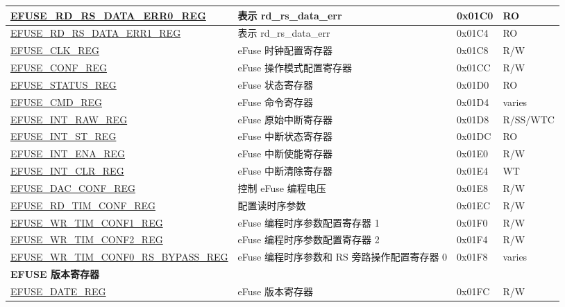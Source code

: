 \begin{longtable}{ | p{7cm} | p{6cm} | p{1.2cm} | p{1.5cm} | }
\hyperref[regdesc:EFUSERDRSDATAERR0REG]{EFUSE\_RD\_RS\_DATA\_ERR0\_REG} & 表示 rd\_rs\_data\_err & 0x01C0 & RO \\ \hline
\hyperref[regdesc:EFUSERDRSDATAERR1REG]{EFUSE\_RD\_RS\_DATA\_ERR1\_REG} & 表示 rd\_rs\_data\_err & 0x01C4 & RO \\ \hline
\hyperref[regdesc:EFUSECLKREG]{EFUSE\_CLK\_REG} & eFuse 时钟配置寄存器 & 0x01C8 & R/W \\ \hline
\hyperref[regdesc:EFUSECONFREG]{EFUSE\_CONF\_REG} & eFuse 操作模式配置寄存器 & 0x01CC & R/W \\ \hline
\hyperref[regdesc:EFUSESTATUSREG]{EFUSE\_STATUS\_REG} & eFuse 状态寄存器 & 0x01D0 & RO \\ \hline
\hyperref[regdesc:EFUSECMDREG]{EFUSE\_CMD\_REG} & eFuse 命令寄存器 & 0x01D4 & varies \\ \hline
\hyperref[regdesc:EFUSEINTRAWREG]{EFUSE\_INT\_RAW\_REG} & eFuse 原始中断寄存器 & 0x01D8 & R/SS/WTC \\ \hline
\hyperref[regdesc:EFUSEINTSTREG]{EFUSE\_INT\_ST\_REG} & eFuse 中断状态寄存器 & 0x01DC & RO \\ \hline
\hyperref[regdesc:EFUSEINTENAREG]{EFUSE\_INT\_ENA\_REG} & eFuse 中断使能寄存器 & 0x01E0 & R/W \\ \hline
\hyperref[regdesc:EFUSEINTCLRREG]{EFUSE\_INT\_CLR\_REG} & eFuse 中断清除寄存器 & 0x01E4 & WT \\ \hline
\hyperref[regdesc:EFUSEDACCONFREG]{EFUSE\_DAC\_CONF\_REG} & 控制 eFuse 编程电压 & 0x01E8 & R/W \\ \hline
\hyperref[regdesc:EFUSERDTIMCONFREG]{EFUSE\_RD\_TIM\_CONF\_REG} & 配置读时序参数 & 0x01EC & R/W \\ \hline
\hyperref[regdesc:EFUSEWRTIMCONF1REG]{EFUSE\_WR\_TIM\_CONF1\_REG} & eFuse 编程时序参数配置寄存器 1 & 0x01F0 & R/W \\ \hline
\hyperref[regdesc:EFUSEWRTIMCONF2REG]{EFUSE\_WR\_TIM\_CONF2\_REG} & eFuse 编程时序参数配置寄存器 2 & 0x01F4 & R/W \\ \hline
\hyperref[regdesc:EFUSEWRTIMCONF0RSBYPASSREG]{EFUSE\_WR\_TIM\_CONF0\_RS\_BYPASS\_REG} & eFuse 编程时序参数和 RS 旁路操作配置寄存器 0 & 0x01F8 & varies \\ \hline
\multicolumn{4}{|l|}{\textbf{EFUSE 版本寄存器}} \\ \hline
\hyperref[regdesc:EFUSEDATEREG]{EFUSE\_DATE\_REG} & eFuse 版本寄存器 & 0x01FC & R/W \\ \hline
\end{longtable}
